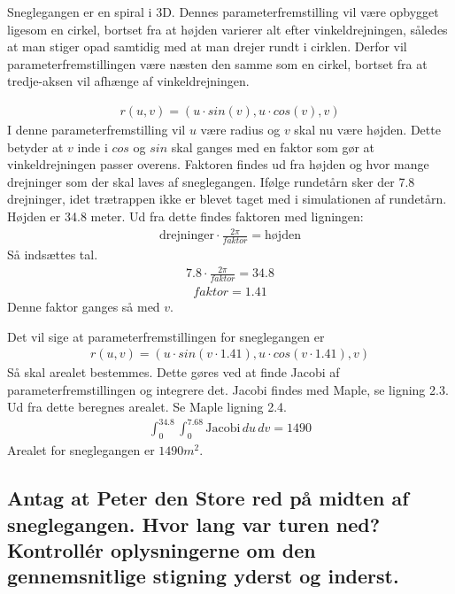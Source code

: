 Sneglegangen er en spiral i 3D. Dennes parameterfremstilling vil være opbygget ligesom en cirkel, bortset fra at højden varierer alt efter vinkeldrejningen, således at man stiger opad samtidig med at man drejer rundt i cirklen. Derfor vil parameterfremstillingen være næsten den samme som en cirkel, bortset fra at tredje-aksen vil afhænge af vinkeldrejningen.

\begin{align}
    r(u,v) = (u \cdot sin(v),u \cdot cos(v),v)
\end{align}
I denne parameterfremstilling vil $u$ være radius og $v$ skal nu være højden. Dette betyder at $v$ inde i $cos$ og $sin$ skal ganges med en faktor som gør at vinkeldrejningen passer overens. Faktoren findes ud fra højden og hvor mange drejninger som der skal laves af sneglegangen. Ifølge rundetårn sker der 7.8 drejninger, idet trætrappen ikke er blevet taget med i simulationen af rundetårn. Højden er 34.8 meter.
Ud fra dette findes faktoren med ligningen:
\begin{align}
    \text{drejninger} \cdot \frac{2 \pi}{faktor} = \text{højden}
\end{align}
Så indsættes tal.
\begin{align}
    7.8 \cdot \frac{2 \pi}{faktor} = 34.8 
\end{align}
\begin{align}
    faktor = 1.41 
\end{align}
Denne faktor ganges så med $v$. 

Det vil sige at parameterfremstillingen for sneglegangen er
\begin{align}
    r(u,v) = (u \cdot sin(v \cdot 1.41),u \cdot cos(v \cdot 1.41),v) 
\end{align}
Så skal arealet bestemmes. Dette gøres ved at finde Jacobi af parameterfremstillingen og integrere det. Jacobi findes med Maple, se ligning 2.3. 
Ud fra dette beregnes arealet. Se Maple ligning 2.4.
\begin{align}
    \int^{34.8}_{0} \int^{7.68}_{0} \text{Jacobi} \,du \,dv = 1490
\end{align}
Arealet for sneglegangen er $1490 m^2$.

\subsection{Antag at Peter den Store red på midten af sneglegangen. Hvor lang var turen ned? Kontrollér oplysningerne om den gennemsnitlige stigning yderst og inderst.}

